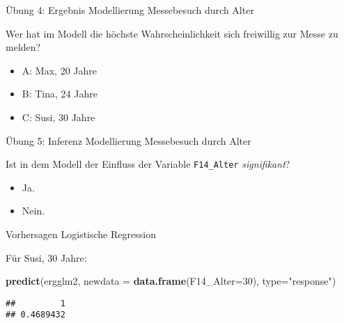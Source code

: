 \documentclass[ignorenonframetext,]{beamer}
\newenvironment{Shaded}{\begin{snugshade}}{\end{snugshade}}
\newcommand{\KeywordTok}[1]{\textcolor[rgb]{0.13,0.29,0.53}{\textbf{{#1}}}}
\newcommand{\DataTypeTok}[1]{\textcolor[rgb]{0.13,0.29,0.53}{{#1}}}
\newcommand{\DecValTok}[1]{\textcolor[rgb]{0.00,0.00,0.81}{{#1}}}
\newcommand{\StringTok}[1]{\textcolor[rgb]{0.31,0.60,0.02}{{#1}}}
\newcommand{\NormalTok}[1]{{#1}}
\providecommand{\tightlist}{%
  \setlength{\itemsep}{0pt}\setlength{\parskip}{0pt}}
\begin{document}
\begin{frame}{Übung 4: Ergebnis Modellierung Messebesuch durch Alter}

Wer hat im Modell die höchste Wahrscheinlichkeit sich freiwillig zur
Messe zu melden?

\begin{itemize}
\tightlist
\item
  A: Max, 20 Jahre
\item
  B: Tina, 24 Jahre
\item
  C: Susi, 30 Jahre
\end{itemize}

\end{frame}

\begin{frame}[fragile]{Übung 5: Inferenz Modellierung Messebesuch durch
Alter}

Ist in dem Modell der Einfluss der Variable \texttt{F14\_Alter}
\emph{signifikant}?

\begin{itemize}
\tightlist
\item
  Ja.
\item
  Nein.
\end{itemize}

\end{frame}

\begin{frame}[fragile]{Vorhersagen Logistische Regression}

Für Susi, 30 Jahre:

\begin{Shaded}
\begin{Highlighting}[]
\KeywordTok{predict}\NormalTok{(ergglm2, }
        \DataTypeTok{newdata =} \KeywordTok{data.frame}\NormalTok{(}\DataTypeTok{F14_Alter=}\DecValTok{30}\NormalTok{), }
        \DataTypeTok{type=}\StringTok{"response"}\NormalTok{)}
\end{Highlighting}
\end{Shaded}

\begin{verbatim}
##         1 
## 0.4689432
\end{verbatim}

\end{frame}
\end{document}
